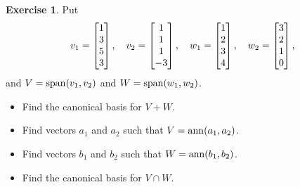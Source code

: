 \documentclass[a4paper]{amsart}
\theoremstyle{definition}
\newtheorem{exercise}{Exercise}
\begin{document}
\begin{exercise}\label{ex-plus-cap-i}
 Put 
 \[ v_1 = \left[\begin{matrix} 1 \\ 3 \\ 5 \\ 3 \end{matrix}\right] , \quad
    v_2 = \left[\begin{matrix} 1 \\ 1 \\ 1 \\ -3 \end{matrix}\right] , \quad
    w_1 = \left[\begin{matrix} 1 \\ 2 \\ 3 \\ 4 \end{matrix}\right] , \quad
    w_2 = \left[\begin{matrix} 3 \\ 2 \\ 1 \\ 0 \end{matrix}\right] ,
 \]
 and $V=\operatorname{span}(v_1,v_2)$ and $W=\operatorname{span}(w_1,w_2)$.
 \begin{itemize}
  \item[(a)] Find the canonical basis for $V+W$.
  \item[(b)] Find vectors $a_1$ and $a_2$ such that
   $V=\operatorname{ann}(a_1,a_2)$. 
  \item[(c)] Find vectors $b_1$ and $b_2$ such that
   $W=\operatorname{ann}(b_1,b_2)$. 
  \item[(d)] Find the canonical basis for $V\cap W$.
 \end{itemize}
\end{exercise}
\end{document}
